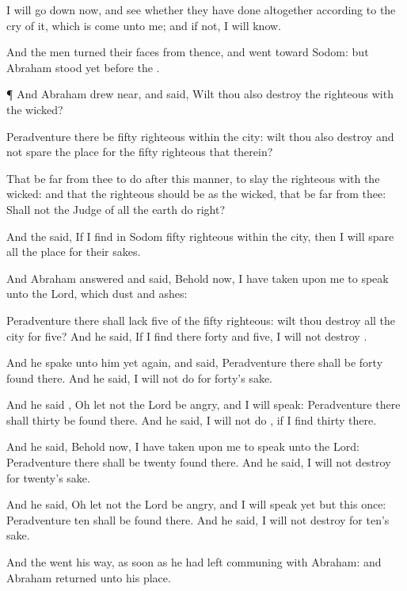 {I will go
down now, and
see whether they have
done
altogether according to the
cry of it, which is
come unto me; and if not, I will
know.

And the
men turned their
faces from thence, and
went toward
Sodom: but
Abraham
stood
yet
before the
{}.


\par }{\PP {}¶ And
Abraham drew
near, and
said, Wilt thou also
destroy the
righteous
with the
wicked?

Peradventure there
be
fifty
righteous
within the
city: wilt thou also
destroy and not
spare the
place
for the
fifty
righteous that
{}
therein?

That be
far from thee to
do after this
manner, to
slay the
righteous with the
wicked: and that the
righteous should be as the
wicked, that be
far from thee: Shall not the
Judge of all the
earth
do
right?

And the
{}
said, If I
find in
Sodom
fifty
righteous
within the
city, then I will
spare all the
place for their sakes.

And
Abraham
answered and
said, Behold now, I have taken upon
me to
speak unto the
Lord,
which
{}
dust and
ashes:

Peradventure there shall
lack
five of the
fifty
righteous: wilt thou
destroy all the
city for
{}
five? And he
said, If I
find there
forty and
five, I will not
destroy
{}.

And he
spake unto him yet
again, and
said, Peradventure there shall be
forty
found there. And he
said, I will not
do
{} for
forty’s sake.

And he
said
{},
Oh let not the
Lord be
angry, and I will
speak: Peradventure there shall
thirty be
found there. And he
said, I will not
do
{}, if I
find
thirty there.

And he
said, Behold now, I have taken upon
me to
speak unto the
Lord: Peradventure there shall be
twenty
found there. And he
said, I will not
destroy
{} for
twenty’s sake.

And he
said, Oh let not the
Lord be
angry, and I will
speak
yet but this
once: Peradventure
ten shall be
found there. And he
said, I will not
destroy
{} for
ten’s sake.

And the
{} went his
way, as soon
as he had
left
communing with
Abraham: and
Abraham
returned unto his
place.




}
